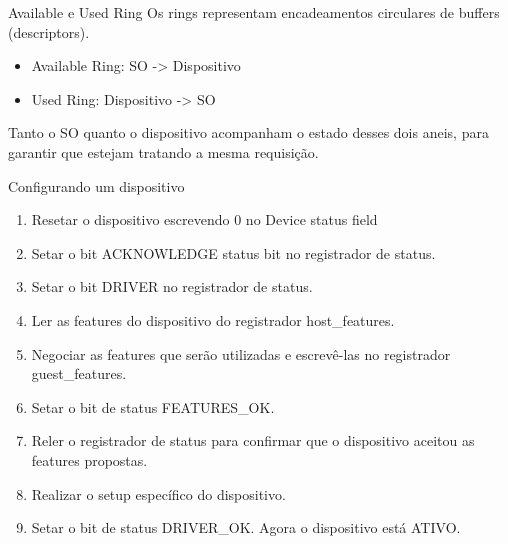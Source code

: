 \documentclass[brazil,nolapesd,aspectratio=169,noartschool]{lapesd-slides}
\begin{document}
\begin{frame}{Available e Used Ring}
	Os rings representam encadeamentos circulares de buffers (descriptors).


	\begin{itemize}
		\item Available Ring: SO -> Dispositivo
		\item Used Ring: Dispositivo -> SO
	\end{itemize}

	\vspace{1em}

	Tanto o SO quanto o dispositivo acompanham o estado desses dois aneis, para garantir que estejam
	tratando a mesma requisição.
\end{frame}

\begin{frame}{Configurando um dispositivo}
	\begin{enumerate}
		\item Resetar o dispositivo escrevendo 0 no Device status field
		\item Setar o bit ACKNOWLEDGE status bit no registrador de status.
		\item Setar o bit DRIVER no registrador de status.
		\item Ler as features do dispositivo do registrador host\_features.
		\item Negociar as features que serão utilizadas e escrevê-las no registrador guest\_features.
		\item Setar o bit de status FEATURES\_OK.
		\item Reler o registrador de status para confirmar que o dispositivo aceitou as features propostas.
		\item Realizar o setup específico do dispositivo.
		\item Setar o bit de status DRIVER\_OK. Agora o dispositivo está ATIVO.
	\end{enumerate}
\end{frame}
\end{document}
